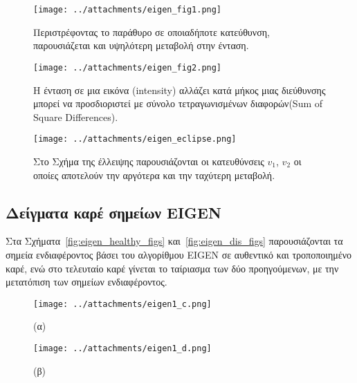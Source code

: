 \newpage
 
 \begin{figure}[ht!]
\begin{minipage}[c]{1.0\linewidth}
\centering
\texttt{[image: ../attachments/eigen\_fig1.png]}
\caption{Περιστρέφοντας το παράθυρο σε οποιαδήποτε κατεύθυνση, παρουσιάζεται και υψηλότερη μεταβολή στην ένταση.}
\label{fig:eigen_fig1}
\end{minipage}
\end{figure}

 \begin{figure}[ht!]
\begin{minipage}[c]{1.0\textwidth}
\centering
\texttt{[image: ../attachments/eigen\_fig2.png]}
\caption{Η ένταση σε μια εικόνα (intensity) αλλάζει κατά μήκος μιας διεύθυνσης μπορεί να προσδιοριστεί με σύνολο τετραγωνισμένων διαφορών(Sum of Square Differences).}
\label{fig:eigen_fig2}
\end{minipage}

\end{figure}

\vspace{2cm}

\begin{figure}[!h]
\begin{minipage}[c]{1.0\linewidth}
\centering
\texttt{[image: ../attachments/eigen\_eclipse.png]}
\end{minipage}
\caption{Στο Σχήμα της έλλειψης παρουσιάζονται οι κατευθύνσεις $v_1$, $v_2$ οι οποίες αποτελούν την αργότερα και την ταχύτερη μεταβολή.}
\label{fig:eigen_ellipse}
\end{figure}

\newpage

\subsection{Δείγματα καρέ σημείων EIGEN}
 
Στα Σχήματα~\ref{fig:eigen_healthy_figs} και~\ref{fig:eigen_dis_figs} παρουσιάζονται τα σημεία ενδιαφέροντος βάσει του αλγορίθμου EIGEN σε αυθεντικό και τροποποιημένο καρέ, ενώ στο τελευταίο καρέ 
γίνεται το ταίριασμα των δύο προηγούμενων, με την μετατόπιση των σημείων ενδιαφέροντος.\\
 

 
\begin{figure}[!ht]
\begin{minipage}[b]{0.45\linewidth}
\centering
\texttt{[image: ../attachments/eigen1\_c.png]}
\caption*{(α)}
\label{fig:eigen_1}
\end{minipage}
\hspace{0.9cm}
\begin{minipage}[b]{0.45\linewidth}
\centering
\texttt{[image: ../attachments/eigen1\_d.png]}
\caption*{(β)}
\label{fig:eigen_2}
\end{minipage}
\end{figure}



